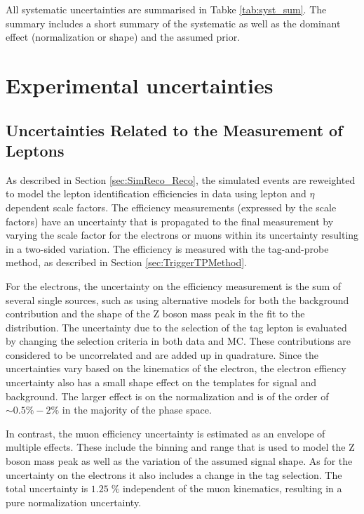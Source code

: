 All systematic uncertainties are summarised in Tabke \ref{tab:syst_sum}. The summary includes a short summary of the systematic as well as the dominant effect (normalization or shape) and
the assumed prior.

\section{Experimental uncertainties}
\label{sec:exp_uncert}

\subsection{Uncertainties Related to the Measurement of  Leptons}

As described in Section \ref{sec:SimReco_Reco}, the simulated events are reweighted to model the lepton identification efficiencies in data using lepton \pt and $\eta$ dependent scale factors. The efficiency measurements (expressed by the scale factors) have an uncertainty that is propagated to the final measurement by varying the scale factor for the electrons or muons within its uncertainty resulting in a two-sided variation.
The efficiency is measured with the tag-and-probe method, as described in Section \ref{sec:TriggerTPMethod}.

For the electrons, the uncertainty on the efficiency measurement is the sum of several single sources, such as using alternative models for both the background contribution
and the shape of the Z boson mass peak in the fit to the \mll distribution.
The uncertainty due to the selection of the tag lepton is evaluated by changing the selection criteria in both data and MC.
These contributions are considered to be uncorrelated and are added up in quadrature. 
Since the uncertainties vary based on the kinematics of the electron, the electron effiency uncertainty also has a small shape effect on the templates for signal and background. The larger effect
is on the normalization and is of the order of $\sim 0.5\% - 2\%$ in the majority of the phase space.

In contrast, the muon efficiency uncertainty is estimated as an envelope of multiple effects. These include the binning and range that is used to model the Z boson mass peak as well as the variation of the assumed signal shape. As for the uncertainty on the electrons it also includes a change in the tag selection.
The total uncertainty is $1.25 \; \%$ independent of the muon kinematics, resulting in a pure normalization uncertainty.

